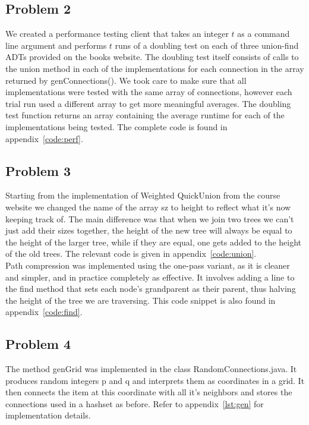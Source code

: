 \documentclass{article}
\begin{document}
\subsection*{Problem 2}
We created a performance testing client that takes an integer $t$ as a command line argument and performs $t$ runs of a doubling test on each of three union-find ADTs provided on the books website. The doubling test itself consists of calls to the union method in each of the implementations for each connection in the array returned by genConnections(). We took care to make sure that all implementations were tested with the same array of connections, however each trial run used a different array to get more meaningful averages. The doubling test function returns an array containing the average runtime for each of the implementations being tested. The complete code is found in appendix~\ref{code:perf}.


\subsection*{Problem 3}
Starting from the implementation of Weighted QuickUnion from the course website \cite{Algs4} we changed the name of the array sz to height to reflect what it's now keeping track of. The main difference was that when we join two trees we can't just add their sizes together, the height of the new tree will always be equal to the height of the larger tree, while if they are equal, one gets added to the height of the old trees. The relevant code is given in appendix~\ref{code:union}.\\

Path compression was implemented using the one-pass variant, as it is cleaner and simpler, and in practice completely as effective. It involves adding a line to the find method that sets each node's grandparent as their parent, thus halving the height of the tree we are traversing. This code snippet is also found in appendix~\ref{code:find}.

\subsection*{Problem 4}
The method genGrid was implemented in the class RandomConnections.java. It produces random integers p and q and interprets them as coordinates in a grid. It then connects the item at this coordinate with all it's neighbors and stores the connections used in a hashset as before. Refer to appendix~\ref{lst:gen} for implementation details.
\end{document}
